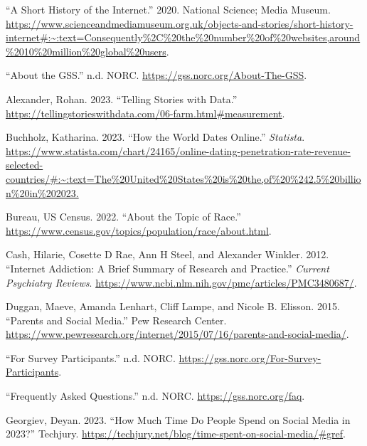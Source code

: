 \documentclass[
]{article}
\newlength{\cslhangindent}
\newlength{\cslentryspacingunit} %
\newenvironment{CSLReferences}[2] %
 {%
  \setlength{\parindent}{0pt}
  \ifodd #1
  \let\oldpar\par
  \def\par{\hangindent=\cslhangindent\oldpar}
  \fi
  \setlength{\parskip}{#2\cslentryspacingunit}
 }%
 {}
\begin{document}
\hypertarget{refs}{}
\begin{CSLReferences}{1}{0}
\leavevmode{}%
{``A Short History of the Internet.''} 2020. National Science; Media
Museum.
\url{https://www.scienceandmediamuseum.org.uk/objects-and-stories/short-history-internet\#:~:text=Consequently\%2C\%20the\%20number\%20of\%20websites,around\%2010\%20million\%20global\%20users}.

\leavevmode{}%
{``About the GSS.''} n.d. NORC.
\url{https://gss.norc.org/About-The-GSS}.

\leavevmode{}%
Alexander, Rohan. 2023. {``Telling Stories with Data.''}
\url{https://tellingstorieswithdata.com/06-farm.html\#measurement}.

\leavevmode{}%
Buchholz, Katharina. 2023. {``How the World Dates Online.''}
\emph{Statista}.
\url{https://www.statista.com/chart/24165/online-dating-penetration-rate-revenue-selected-countries/\#:~:text=The\%20United\%20States\%20is\%20the,of\%20\%242.5\%20billion\%20in\%202023.}

\leavevmode{}%
Bureau, US Census. 2022. {``About the Topic of Race.''}
\url{https://www.census.gov/topics/population/race/about.html}.

\leavevmode{}%
Cash, Hilarie, Cosette D Rae, Ann H Steel, and Alexander Winkler. 2012.
{``Internet Addiction: A Brief Summary of Research and Practice.''}
\emph{Current Psychiatry Reviews}.
\url{https://www.ncbi.nlm.nih.gov/pmc/articles/PMC3480687/}.

\leavevmode{}%
Duggan, Maeve, Amanda Lenhart, Cliff Lampe, and Nicole B. Elisson. 2015.
{``Parents and Social Media.''} Pew Research Center.
\url{https://www.pewresearch.org/internet/2015/07/16/parents-and-social-media/}.

\leavevmode{}%
{``For Survey Participants.''} n.d. NORC.
\url{https://gss.norc.org/For-Survey-Participants}.

\leavevmode{}%
{``Frequently Asked Questions.''} n.d. NORC.
\url{https://gss.norc.org/faq}.

\leavevmode{}%
Georgiev, Deyan. 2023. {``How Much Time Do People Spend on Social Media
in 2023?''} Techjury.
\url{https://techjury.net/blog/time-spent-on-social-media/\#gref}.


\end{CSLReferences}
\end{document}
